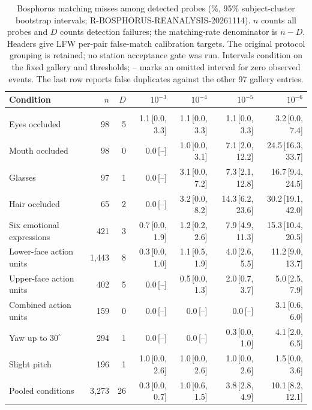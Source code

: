 \begin{table}[t]
\centering
\begingroup\color{black}
\caption{Bosphorus matching misses among detected probes (\%, 95\% subject-cluster bootstrap intervals; R-BOSPHORUS-REANALYSIS-20261114). $n$ counts all probes and $D$ counts detection failures; the matching-rate denominator is $n-D$. Headers give LFW per-pair false-match calibration targets. The original protocol grouping is retained; no station acceptance gate was run. Intervals condition on the fixed gallery and thresholds; -- marks an omitted interval for zero observed events. The last row reports false duplicates against the other 97 gallery entries.}
\label{tab:bosphorus}
\footnotesize
\setlength{\tabcolsep}{4pt}
\begin{tabular}{@{}>{\raggedright\arraybackslash}p{3.8cm}rrrrrr@{}}
\toprule
Condition & $n$ & $D$ & $10^{-3}$ & $10^{-4}$ & $10^{-5}$ & $10^{-6}$ \\
\midrule
\multicolumn{7}{@{}l}{\textit{Conditions grouped as plausible for attended capture}} \\
Eyes occluded & 98 & 5 & 1.1\,[0.0, 3.3] & 1.1\,[0.0, 3.3] & 1.1\,[0.0, 3.3] & 3.2\,[0.0, 7.4] \\
Mouth occluded & 98 & 0 & 0.0\,[--] & 1.0\,[0.0, 3.1] & 7.1\,[2.0, 12.2] & 24.5\,[16.3, 33.7] \\
Glasses & 97 & 1 & 0.0\,[--] & 3.1\,[0.0, 7.2] & 7.3\,[2.1, 12.8] & 16.7\,[9.4, 24.5] \\
Hair occluded & 65 & 2 & 0.0\,[--] & 3.2\,[0.0, 8.2] & 14.3\,[6.2, 23.6] & 30.2\,[19.1, 42.0] \\
Six emotional expressions & 421 & 3 & 0.7\,[0.0, 1.9] & 1.2\,[0.2, 2.6] & 7.9\,[4.9, 11.3] & 15.3\,[10.4, 20.5] \\
Lower-face action units & 1{,}443 & 8 & 0.3\,[0.0, 1.0] & 1.1\,[0.5, 1.9] & 4.0\,[2.6, 5.5] & 11.2\,[9.0, 13.7] \\
Upper-face action units & 402 & 5 & 0.0\,[--] & 0.5\,[0.0, 1.3] & 2.0\,[0.7, 3.7] & 5.0\,[2.5, 7.9] \\
Combined action units & 159 & 0 & 0.0\,[--] & 0.0\,[--] & 0.0\,[--] & 3.1\,[0.6, 6.0] \\
Yaw up to $30^\circ$ & 294 & 1 & 0.0\,[--] & 0.0\,[--] & 0.3\,[0.0, 1.0] & 4.1\,[2.0, 6.5] \\
Slight pitch & 196 & 1 & 1.0\,[0.0, 2.6] & 1.0\,[0.0, 2.6] & 1.0\,[0.0, 2.6] & 1.5\,[0.0, 3.6] \\
Pooled conditions & 3{,}273 & 26 & 0.3\,[0.0, 0.7] & 1.0\,[0.6, 1.5] & 3.8\,[2.8, 4.9] & 10.1\,[8.2, 12.1] \\

\end{tabular}
\end{table}
